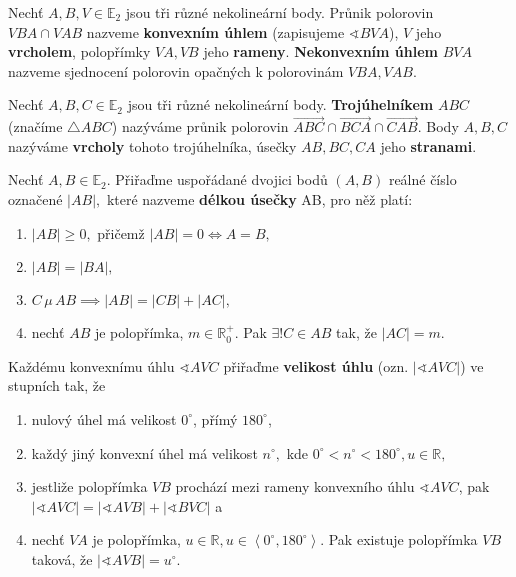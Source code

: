\begin{definition}
  Nechť $A,B,V \in \mathbb E_2$ jsou tři různé nekolineární body. Průnik polorovin $VBA \cap VAB$ nazveme \textbf{konvexním úhlem} (zapisujeme $\sphericalangle BVA$), $V$ jeho \textbf{vrcholem}, polopřímky $VA, VB$ jeho \textbf{rameny}. \textbf{Nekonvexním úhlem} $BVA$ nazveme sjednocení polorovin opačných k polorovinám $VBA,VAB.$
\end{definition}

\begin{definition}
  Nechť $A,B,C\in \mathbb E_2$ jsou tři různé nekolineární body. \textbf{Trojúhelníkem} $ABC$ (značíme $\triangle ABC$) nazýváme průnik polorovin $\overrightarrow{ABC} \cap \overrightarrow{BCA} \cap \overrightarrow{CAB}$. Body $A,B,C$ nazýváme \textbf{vrcholy} tohoto trojúhelníka, úsečky $AB, BC, CA$ jeho \textbf{stranami}.
\end{definition}

\begin{definition}
  Nechť $A,B\in \mathbb E_2.$ Přiřaďme uspořádané dvojici bodů $(A,B)$ reálné číslo označené $|AB|,$ které nazveme \textbf{délkou úsečky} AB, pro něž platí:
  \begin{enumerate}[$i.$]
    \item $|AB|\geq 0,$ přičemž $|AB|=0 \iff A=B,$
    \item $|AB|=|BA|,$
    \item $C\, \mu \, AB \implies |AB|=|CB|+|AC|,$
    \item nechť $AB$ je polopřímka, $m\in \mathbb R^+_0.$ Pak $\exists ! C\in AB$ tak, že $|AC|=m.$
  \end{enumerate}
\end{definition}

\begin{definition}
  Každému konvexnímu úhlu $\sphericalangle AVC$ přiřaďme \textbf{velikost úhlu} (ozn. $|\sphericalangle AVC|$) ve stupních tak, že
  \begin{enumerate}[$i.$]
    \item nulový úhel má velikost $0^\circ$, přímý $180^\circ$,
    \item každý jiný konvexní úhel má velikost $n^\circ, $ kde $0^\circ< n ^\circ< 180^\circ, u \in \mathbb R,$
    \item jestliže polopřímka $VB$ prochází mezi rameny konvexního úhlu $\sphericalangle AVC$, pak $|\sphericalangle AVC|=|\sphericalangle AVB|+ |\sphericalangle BVC|$ a
    \item nechť $VA$ je polopřímka, $u \in \mathbb R, u \in \left < 0 ^\circ,180^\circ \right >$. Pak existuje polopřímka $VB$ taková, že $|\sphericalangle AVB|=u^\circ.$
  \end{enumerate}
\end{definition}

